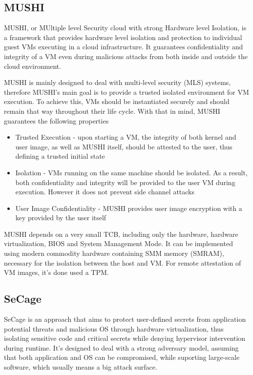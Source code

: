 \subsection{MUSHI}

MUSHI, or MUltiple level Security cloud with strong Hardware level Isolation, is a framework that provides hardware level isolation and protection to individual guest VMs executing in a cloud infrastructure. It guarantees confidentiality and integrity of a VM even during malicious attacks from both inside and outside the cloud environment.

MUSHI is mainly designed to deal with multi-level security (MLS) \cite{mlsMIT} systems, therefore MUSHI's main goal is to provide a trusted isolated environment for VM execution. To achieve this, VMs should be instantiated securely and should remain that way throughout their life cycle. With that in mind, MUSHI guarantees the following properties

\begin{itemize}
	\item Trusted Execution - upon starting a VM, the integrity of both kernel and user image, as well as MUSHI itself, should be attested to the user, thus defining a trusted initial state

	\item Isolation - VMs running on the same machine should be isolated. As a result, both confidentiality and integrity will be provided to the user VM during execution. However it does not prevent side channel attacks
	
	\item User Image Confidentiality - MUSHI provides user image encryption with a key provided by the user itself
	
\end{itemize}

MUSHI depends on a very small TCB, including only the hardware, hardware virtualization, BIOS and System Management Mode. It can be implemented using modern commodity hardware containing SMM memory (SMRAM), necessary for the isolation between the host and VM. For remote attestation of VM images, it's done used a TPM. \cite{mushiPaper}


\subsection{SeCage}

SeCage \cite{SeCagePaper} is an approach that aims to protect user-defined secrets from application potential threats and malicious OS through hardware virtualization, thus isolating sensitive code and critical secrets while denying hypervisor intervention during runtime.
It's designed to deal with a strong adversary model, assuming that both application and OS can be compromised, while suporting large-scale software, which usually means a big attack surface.

